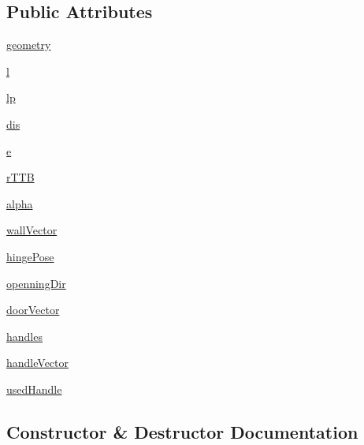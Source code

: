 \subsection*{Public Attributes}
\begin{DoxyCompactItemize}
\item 
\hyperlink{classcmd__TTB_1_1doors_1_1Door_a01b6754c275f7145c1c95f3062883503}{geometry}
\item 
\hyperlink{classcmd__TTB_1_1doors_1_1Door_a16fa05c6bb89c77f16b20499e48bb163}{l}
\item 
\hyperlink{classcmd__TTB_1_1doors_1_1Door_a07616d26f3df6efd4b51b199d408c494}{lp}
\item 
\hyperlink{classcmd__TTB_1_1doors_1_1Door_abcf8527d55a058f835abdb3780fe28cc}{dis}
\item 
\hyperlink{classcmd__TTB_1_1doors_1_1Door_a3f30afe81c6f5496a150396786edafef}{e}
\item 
\hyperlink{classcmd__TTB_1_1doors_1_1Door_a4ee8a303c778727a2b64a9bee7fa5b0a}{r\+T\+TB}
\item 
\hyperlink{classcmd__TTB_1_1doors_1_1Door_a5a5ba84424f74f473c3d4db493fbfe8c}{alpha}
\item 
\hyperlink{classcmd__TTB_1_1doors_1_1Door_a4004e9f386328abd8dd549878d2bd9f8}{wall\+Vector}
\item 
\hyperlink{classcmd__TTB_1_1doors_1_1Door_acb238f97ae19a85d9ea3cbf97b010cb8}{hinge\+Pose}
\item 
\hyperlink{classcmd__TTB_1_1doors_1_1Door_a8c669d6f1e191e3807a4eeffedbfb094}{openning\+Dir}
\item 
\hyperlink{classcmd__TTB_1_1doors_1_1Door_a891872645f7905fda74466b270af70df}{door\+Vector}
\item 
\hyperlink{classcmd__TTB_1_1doors_1_1Door_ab9a77891fb86feafd81ce4f16deb4829}{handles}
\item 
\hyperlink{classcmd__TTB_1_1doors_1_1Door_a4f3df8d5e414b26f99a0847a73dd6a4a}{handle\+Vector}
\item 
\hyperlink{classcmd__TTB_1_1doors_1_1Door_a8c7e61d5731244caf6322dd2ca9101b9}{used\+Handle}
\end{DoxyCompactItemize}


\subsection{Constructor \& Destructor Documentation}
